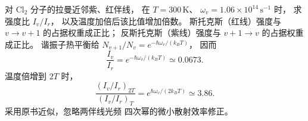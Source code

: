 对 $\mathrm{Cl_2}$ 分子的拉曼近邻紫、红伴线，
在 $T=300\,\mathrm K$、
$\omega_v=1.06\times10^{14}\,\mathrm{s^{-1}}$ 时，
求强度比 $I_v/I_r$，
以及温度加倍后该比值增加倍数。
\exsolution
斯托克斯（红线）强度与
$v\to v+1$ 的占据权重成正比；
反斯托克斯（紫线）强度与
$v+1\to v$ 的占据权重成正比。
谐振子热平衡给
$N_{v+1}/N_v=e^{-\hbar\omega_v/(k_BT)}$，
因而
\[
 \boxed{\frac{I_v}{I_r}
 =e^{-\hbar\omega_v/(k_BT)}
 \simeq0.0673}.
\]
温度倍增到 $2T$ 时，
\[
 \boxed{\frac{(I_v/I_r)_{2T}}{(I_v/I_r)_T}
 =e^{\hbar\omega_v/(2k_BT)}\simeq3.86}.
\]
\excheck 采用原书近似，忽略两伴线光频
四次幂的微小散射效率修正。
